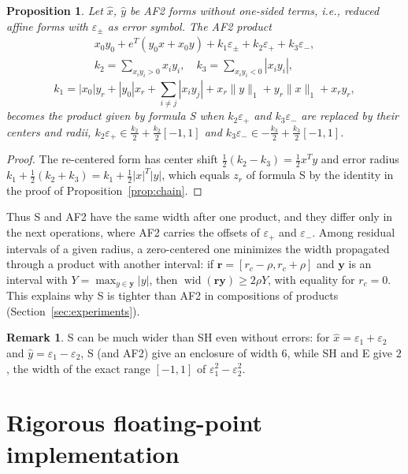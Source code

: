 \documentclass[10pt]{article}
\newtheorem{propo}{Proposition}
\theoremstyle{definition}
\newtheorem{remark}{Remark}
\newcommand{\eps}{\varepsilon}
\newcommand{\wid}{\operatorname{wid}}
\begin{document}
\begin{propo}
\label{prop:af2}
Let $\hat x$, $\hat y$ be AF2 forms without one-sided terms, i.e., reduced affine forms with $\eps_\pm$ as error symbol. The AF2 product~\cite{messine2002extentions}
\[
\begin{gathered}x_0y_0 + e^T(y_0x+x_0y) + k_1\eps_\pm + k_2\eps_+ + k_3\eps_-,\\ k_2=\sum_{x_iy_i>0}x_iy_i,\quad k_3=\sum_{x_iy_i<0}|x_iy_i|,\end{gathered}
\]
\[
k_1 = |x_0|y_r+|y_0|x_r+\sum_{i\ne j}|x_iy_j| + x_r\|y\|_1+y_r\|x\|_1+x_ry_r,
\]
becomes the product given by formula S when $k_2\eps_+$ and $k_3\eps_-$ are replaced by their centers and radii, $k_2\eps_+\in \tfrac{k_2}{2}+\tfrac{k_2}{2}[-1,1]$ and $k_3\eps_-\in-\tfrac{k_3}{2}+\tfrac{k_3}{2}[-1,1]$.
\end{propo}
\begin{proof}
The re-centered form has center shift $\tfrac12(k_2-k_3)=\tfrac12x^Ty$ and error radius $k_1+\tfrac12(k_2+k_3) = k_1+\tfrac12|x|^T|y|$, which equals $z_r$ of formula S by the identity in the proof of Proposition~\ref{prop:chain}.
\end{proof}

Thus S and AF2 have the same width after one product, and they differ only in the next operations, where AF2 carries the offsets of $\eps_+$ and $\eps_-$. Among residual intervals of a given radius, a zero-centered one minimizes the width propagated through a product with another interval: if $\mathbf r=[r_c-\rho,r_c+\rho]$ and $\mathbf y$ is an interval with $Y=\max_{y\in\mathbf y}|y|$, then $\wid(\mathbf r\mathbf y)\ge 2\rho Y$, with equality for $r_c=0$. This explains why S is tighter than AF2 in compositions of products (Section~\ref{sec:experiments}).

\begin{remark}
S can be much wider than SH even without errors: for $\hat x=\eps_1+\eps_2$ and $\hat y=\eps_1-\eps_2$, S (and AF2) give an enclosure of width $6$, while SH and E give $2$, the width of the exact range $[-1,1]$ of $\eps_1^2-\eps_2^2$.
\end{remark}

\section{Rigorous floating-point implementation}
\label{sec:rigor}
\end{document}
